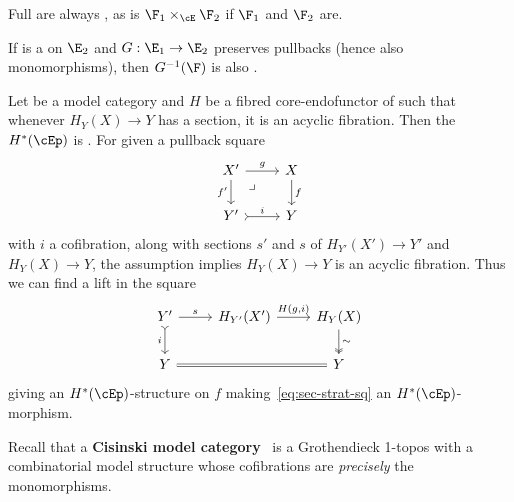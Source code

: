 \begin{eg}
  Full \nfss are always \stratified, as is $\F_1 \times_\cE \F_2$ if $\F_1$ and $\F_2$ are.
\end{eg}

\begin{eg}
  If \F is a \stratified \nfs on $\E_2$ and $G:\E_1\to\E_2$ preserves pullbacks (hence also monomorphisms), then $G^{-1}(\F)$ is also \stratified.
\end{eg}

\begin{eg}\label{thm:sec-afib-strat}
  Let \E be a model category and $H$ be a fibred core-endofunctor of \E such that whenever $H_Y(X)\to Y$ has a section, it is an acyclic fibration.
  Then the \nfs $H^*(\cEp)$ is \stratified.
  For given a pullback square
  \begin{equation}
    \begin{tikzcd}
      X' \ar[d,"f'"'] \ar[r,"g"] \ar[dr,phantom, near start,"\lrcorner"] & X \ar[d,"f"]\\
      Y' \ar[r,"i",tail] & Y
    \end{tikzcd}\label{eq:sec-strat-sq}
  \end{equation}
  with $i$ a cofibration, along with sections $s'$ and $s$ of $H_{Y'}(X')\to Y'$ and $H_Y(X)\to Y$, the assumption implies $H_Y(X)\to Y$ is an acyclic fibration.
  Thus we can find a lift in the square
  \[
    \begin{tikzcd}
      Y' \ar[d,"i"',tail] \ar[r,"s"] & H_{Y'}(X') \ar[r,"{H(g,i)}"] & H_Y(X) \ar[d,"\sim",two heads]\\
      Y \ar[rr,equals] & & Y
    \end{tikzcd}
  \]
  giving an $H^*(\cEp)$-structure on $f$ making~\eqref{eq:sec-strat-sq} an $H^*(\cEp)$-morphism.
\end{eg}

Recall that a \textbf{Cisinski model category}~\cite{cisinski:topos,cisinski:local-acyc} is a Grothendieck 1-topos with a combinatorial model structure whose cofibrations are \emph{precisely} the monomorphisms.

